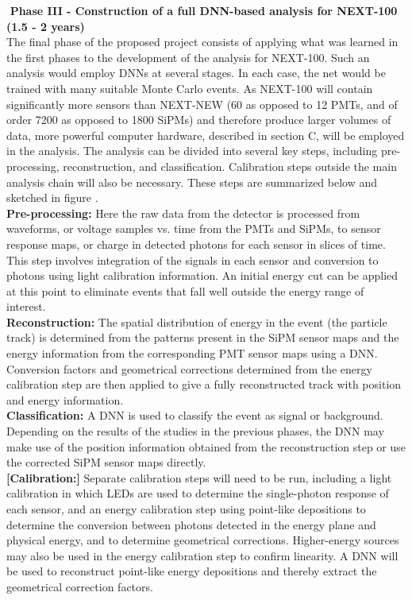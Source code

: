 \documentclass[11pt,a4paper]{article}
\begin{document}
\noindent\textbf{\textbullet\,\,Phase III - Construction of a full DNN-based analysis for NEXT-100 (1.5 - 2 years)}\\
The final phase of the proposed project consists of applying what was learned in the first phases to the development of the analysis for NEXT-100. Such an analysis would employ DNNs at several stages. In each case, the net would be trained with many suitable Monte Carlo events. As NEXT-100 will contain significantly more sensors than NEXT-NEW (60 as opposed to 12 PMTs, and of order 7200 as opposed to 1800 SiPMs) and therefore produce larger volumes of data, more powerful computer hardware, described in section C, will be employed in the analysis. The analysis can be divided into several key steps, including pre-processing, reconstruction, and classification. Calibration steps outside the main analysis chain will also be necessary. These steps are summarized below and sketched in figure .\\

\noindent\textbf{Pre-processing:} Here the raw data from the detector is processed from waveforms, or voltage samples vs. time from the PMTs and SiPMs, to sensor response maps, or charge in detected photons for each sensor in slices of time. This step involves integration of the signals in each sensor and conversion to photons using light calibration information. An initial energy cut can be applied at this point to eliminate events that fall well outside the energy range of interest.\\

\noindent\textbf{Reconstruction:} The spatial distribution of energy in the event (the particle track) is determined from the patterns present in the SiPM sensor maps and the energy information from the corresponding PMT sensor maps using a DNN. Conversion factors and geometrical corrections determined from the energy calibration step are then applied to give a fully reconstructed track with position and energy information.\\

\noindent\textbf{Classification:} A DNN is used to classify the event as signal or background. Depending on the results of the studies in the previous phases, the DNN may make use of the position information obtained from the reconstruction step or use the corrected SiPM sensor maps directly.\\

\noindent\textbf{[Calibration:]} Separate calibration steps will need to be run, including a light calibration in which LEDs are used to determine the single-photon response of each sensor, and an energy calibration step using point-like depositions to determine the conversion between photons detected in the energy plane and physical energy, and to determine geometrical corrections. Higher-energy sources may also be used in the energy calibration step to confirm linearity. A DNN will be used to reconstruct point-like energy depositions and thereby extract the geometrical correction factors.\\
\end{document}
